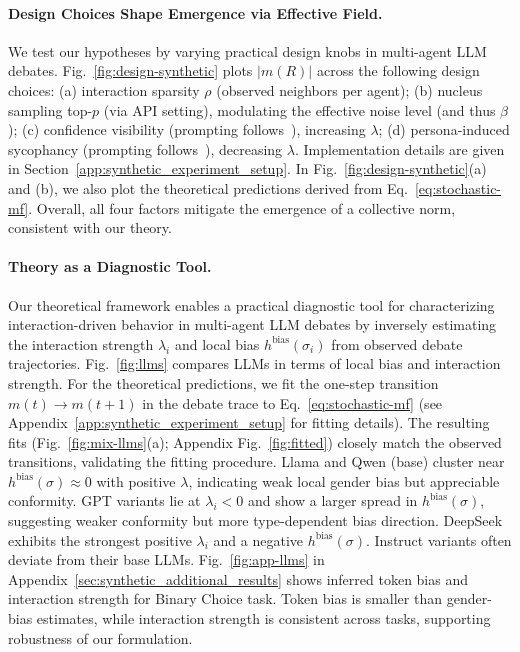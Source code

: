 \documentclass{article}
\theoremstyle{plain}
\theoremstyle{definition}
\theoremstyle{remark}
\begin{document}
\paragraph{Design Choices Shape Emergence via Effective Field.}
We test our hypotheses by varying practical design knobs in multi-agent LLM debates.
Fig.~\ref{fig:design-synthetic} plots \(\lvert m(R)\rvert\) across the following design choices:
(a) interaction sparsity \(\rho\) (observed neighbors per agent);
(b) nucleus sampling top-\(p\) (via API setting), modulating the effective noise level (and thus \(\beta\));
(c) confidence visibility (prompting follows~\cite{eo2025debate}), increasing \(\lambda\);
(d) persona-induced sycophancy (prompting follows~\cite{chen2025persona}), decreasing \(\lambda\). 
Implementation details are given in Section~\ref{app:synthetic_experiment_setup}.
In Fig.~\ref{fig:design-synthetic}(a) and (b), we also plot the theoretical predictions derived from Eq.~\eqref{eq:stochastic-mf}.
Overall, all four factors mitigate the emergence of a collective norm, consistent with our theory. 


\paragraph{Theory as a Diagnostic Tool. }
Our theoretical framework enables a practical diagnostic tool for characterizing interaction-driven behavior in multi-agent LLM debates by inversely estimating the interaction strength $\lambda_i$ and local bias $h^{\textrm{bias}}(\sigma_i)$ from observed debate trajectories. 
Fig.~\ref{fig:llms} compares LLMs in terms of local bias and interaction strength. 
For the theoretical predictions, we fit the one-step transition $m(t)\!\to\! m(t{+}1)$ in the debate trace to Eq.~\eqref{eq:stochastic-mf} (see Appendix~\ref{app:synthetic_experiment_setup} for fitting details). 
The resulting fits (Fig.~\ref{fig:mix-llms}(a); Appendix Fig.~\ref{fig:fitted}) closely match the observed transitions, validating the fitting procedure. 
Llama and Qwen (base) cluster near $h^{\textrm{bias}}(\sigma) \approx 0$ with positive $\lambda$, indicating weak local gender bias but appreciable conformity.
GPT variants lie at $\lambda_i<0$ and show a larger spread in $h^{\textrm{bias}}(\sigma)$, suggesting weaker conformity but more type-dependent bias direction.
DeepSeek exhibits the strongest positive $\lambda_i$ and a negative $h^{\textrm{bias}}(\sigma)$. 
Instruct variants often deviate from their base LLMs. 
Fig.~\ref{fig:app-llms} in Appendix~\ref{sec:synthetic_additional_results} shows inferred token bias and interaction strength for Binary Choice task. Token bias is smaller than gender-bias estimates, while interaction strength is consistent across tasks, supporting robustness of our formulation. 
\end{document}
